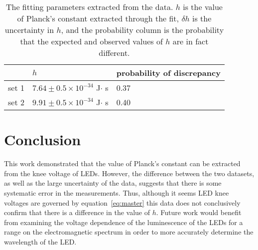 \documentclass[12pt]{spieman}  %
\begin{document}
\begin{spacing}{2}
        \begin{table}[H]
            \caption{The fitting parameters extracted from the data. $h$ is the value of Planck's constant extracted
            through the fit, $\delta h$ is the uncertainty in $h$, and the probability column is the probability that
            the expected and observed values of $h$ are in fact different.}
            \label{tab:results}
            \begin{center}
                \begin{tabular}{|l|l|l|}
                    \hline
                    & $h$                                     & probability of discrepancy \\
                    \hline
                    set 1 & $7.64\pm 0.5\times 10^{-34}$ J$\cdot$ s & 0.37                       \\
                    set 2 & $9.91\pm 0.5\times 10^{-34}$ J$\cdot$ s & 0.40                       \\
                    \hline
                \end{tabular}
            \end{center}
        \end{table}


        \section{Conclusion}\label{sec:conclusion}
        This work demonstrated that the value of Planck's constant can be extracted from the knee voltage of LEDs.
        However, the difference between the two datasets, as well as the large uncertainty of the data, suggests that
        there is some systematic error in the measurements.
        Thus, although it seems LED knee voltages are governed by equation~\eqref{eq:master} this data does not
        conclusively confirm that there is a difference in the value of $h$.
        Future work would benefit from examining the voltage dependence of the luminescence of the LEDs for a range
        on the electromagnetic spectrum in order to more accurately determine the wavelength of the LED\@.

    \end{spacing}


\end{document}
